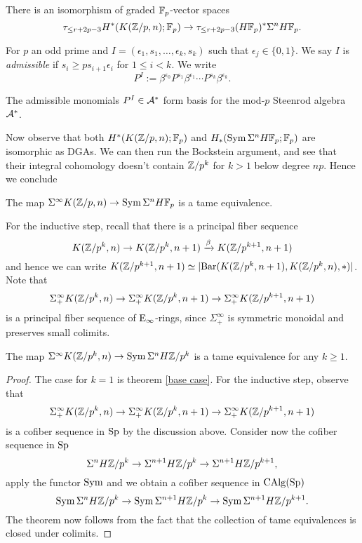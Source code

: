 \begin{corollary}
	There is an isomorphism of graded ${\mathbb{F}}_p$-vector spaces
	\[
	\tau_{\leq r+2p-3}H^{*}( K({\mathbb{Z}}/p,n);{\mathbb{F}}_p) 
	\to
	\tau_{\leq r+2p-3} (H{\mathbb{F}}_p)^*\Sigma^nH{\mathbb{F}}_p.
	\]
	
\end{corollary}


For $p$ an odd prime and $I=(\epsilon_1, s_1, \dots, \epsilon_k, s_k)$ such that $\epsilon_j\in \{0,1\}$.
We say $I$ is \emph{admissible} if $s_i\geq ps_{i+1}\epsilon_i$ for $1\leq i <k$. We write 
$$
P^I:=\beta^{\epsilon_0}P^{s_1}\beta^{\epsilon_1}\cdots P^{s_k}\beta^{\epsilon_k}.
$$
\begin{theorem}
	[??]
	The admissible monomials $P^I\in {\mathcal{A}}^{*}$ form basis for the mod-$p$ Steenrod algebra ${\mathcal{A}}^*$.
\end{theorem}


Now observe that both $H^{*}(K({\mathbb{Z}}/p,n);{\mathbb{F}}_p)$ and $H_{*}(\operatorname{Sym} \Sigma^nH{\mathbb{F}}_p;{\mathbb{F}}_p)$ are isomorphic as DGAs.
We can then run the Bockstein argument, and see that their integral cohomology doesn't contain ${\mathbb{Z}}/p^k$ for $k>1$ below degree $np$.
Hence we conclude
\begin{theorem}
\label{base case}
	The map $\Sigma^{\infty}K({\mathbb{Z}}/p,n) \to 
	\operatorname{Sym} \Sigma^nH{\mathbb{F}}_p$ is a tame equivalence.
\end{theorem}

For the inductive step, recall that there is a principal fiber sequence
\[
K({\mathbb{Z}}/p^k,n)\to 
K({\mathbb{Z}}/p^k,n+1)
\xrightarrow{\beta} K({\mathbb{Z}}/p^{k+1},n+1)
\]
and hence we can write $K({\mathbb{Z}}/p^{k+1},n+1)\simeq \lvert\operatorname{Bar}(K({\mathbb{Z}}/p^k,n+1),K({\mathbb{Z}}/p^k,n),*)\rvert$.
Note that 
\begin{equation}
\label{principal fiber seq for EM-spaces}
	\Sigma^{\infty}_{+}K({\mathbb{Z}}/p^k,n)\to 
\Sigma^{\infty}_{+}K({\mathbb{Z}}/p^k,n+1)
\to 
\Sigma^{\infty}_{+}
K({\mathbb{Z}}/p^{k+1},n+1)
\end{equation}
is a principal fiber sequence of $\operatorname{E}_{\infty}$-rings,
since $\Sigma^{\infty}_{+}$ is symmetric monoidal and preserves small colimits.

\begin{theorem}
	The map $\Sigma^{\infty}K({\mathbb{Z}}/p^k,n) \to 
	\operatorname{Sym} \Sigma^nH{\mathbb{Z}}/{p^k}$ is a tame equivalence for any $k\geq 1$.
\end{theorem}
\begin{proof}
	The case for $k=1$ is theorem \ref{base case}.
	For the inductive step, observe that 
	\[
		\Sigma^{\infty}_{+}K({\mathbb{Z}}/p^k,n)\to 
\Sigma^{\infty}_{+}K({\mathbb{Z}}/p^k,n+1)
\to 
\Sigma^{\infty}_{+}
K({\mathbb{Z}}/p^{k+1},n+1)
\]
is a cofiber sequence in $\operatorname{Sp}$ by the discussion above.
Consider now the cofiber sequence in $\operatorname{Sp}$
\[
\Sigma^nH{\mathbb{Z}}/{p^k}\to \Sigma^{n+1}H{\mathbb{Z}}/{p^k}
\to 
\Sigma^{n+1}H{\mathbb{Z}}/{p^{k+1}},
\]
apply the functor $\operatorname{Sym}$ and we obtain a cofiber sequence in $\operatorname{CAlg}(\operatorname{Sp})$
\[
\operatorname{Sym}\Sigma^nH{\mathbb{Z}}/{p^k}\to 
\operatorname{Sym}\Sigma^{n+1}H{\mathbb{Z}}/{p^k}
\to 
\operatorname{Sym}
\Sigma^{n+1}H{\mathbb{Z}}/{p^{k+1}}.
\]
The theorem now follows from the fact that the collection of tame equivalences is closed under colimits.

\end{proof}

